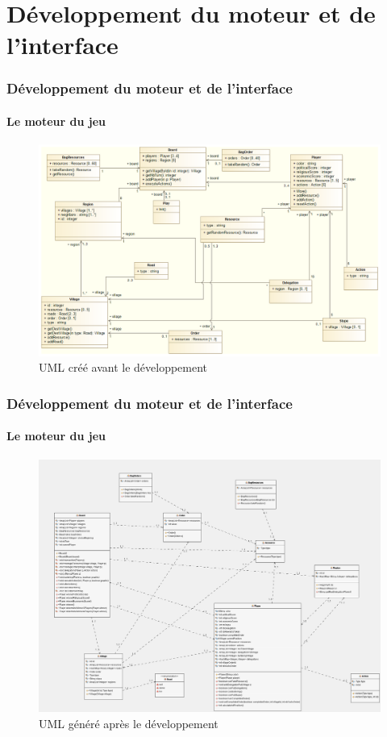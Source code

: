 \section{Développement du moteur et de l'interface}
	\begin{frame}
		\frametitle{Développement du moteur et de l'interface}
		\framesubtitle{Le moteur du jeu}
		\begin{figure}[h]
			\centering
			\includegraphics[width=0.8\linewidth]{images/UML_Himalaya_2}
			\caption{UML créé avant le développement}
			\label{fig:uml}
		\end{figure}
		
	\end{frame}

	\begin{frame}
		\frametitle{Développement du moteur et de l'interface}
		\framesubtitle{Le moteur du jeu}
		\begin{figure}[h]
			\centering
			\includegraphics[width=0.8\linewidth]{images/UML_Himalaya_CORE_3}
			\caption{UML généré après le développement}
			\label{fig:uml}
		\end{figure}
	\end{frame}

